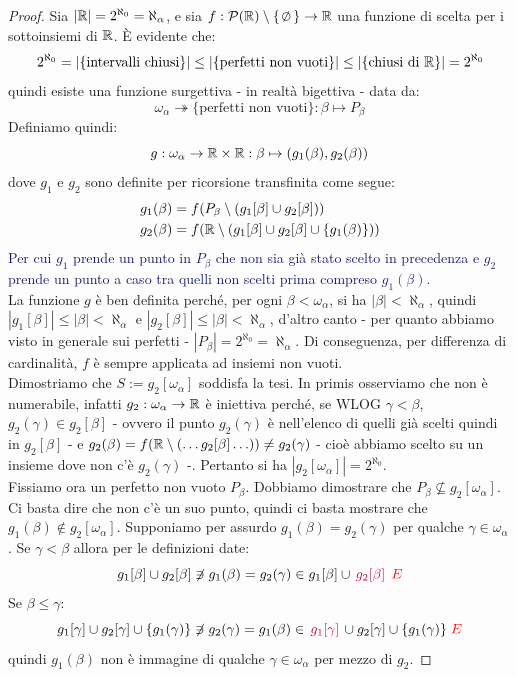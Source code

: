 \begin{proof}
	Sia $|\mathbb R| = 2^{\aleph_0} = \aleph_\alpha$, e sia $f : \ps(\RR) \setminus\{\emptyset\} \to \RR$ una funzione di scelta per i sottoinsiemi di $\mathbb R$. \`E evidente che:
	\[ 2^{\aleph_0} = |\{\text{intervalli chiusi}\}| \leq |\{\text{perfetti non vuoti}\}| \leq |\{\text{chiusi di $\mathbb R$}\}| = 2^{\aleph_0}
		\]
	quindi esiste una funzione surgettiva - in realt\`a bigettiva - data da:
	\[ \omega_\alpha \twoheadrightarrow \{\text{perfetti non vuoti}\} : \beta \mapsto P_\beta
		\]
	Definiamo quindi:
	\[ g : \omega_\alpha \to \mathbb R \times \mathbb R : \beta \mapsto (g_1(\beta),g_2(\beta))
		\]
	dove $g_1$ e $g_2$ sono definite per ricorsione transfinita come segue:
	\begin{align*}
		&g_1(\beta) = f(P_\beta \setminus(g_1[\beta] \cup g_2[\beta])) \\
		&g_2(\beta) = f(\mathbb R \setminus (g_1[\beta] \cup g_2[\beta] \cup \{g_1(\beta)\}))
	\end{align*}
	\textcolor{MidnightBlue}{Per cui $g_1$ prende un punto in $P_\beta$ che non sia gi\`a stato scelto in precedenza e $g_2$ prende un punto a caso tra quelli non scelti prima compreso $g_1(\beta)$.}\\
	La funzione $g$ \`e ben definita perch\'e, per ogni $\beta < \omega_\alpha$, si ha $|\beta| < \aleph_\alpha$, quindi $|g_1[\beta]| \leq |\beta| < \aleph_\alpha$ e $|g_2[\beta]|\leq |\beta| < \aleph_\alpha$,
	d'altro canto - per quanto abbiamo visto in generale sui perfetti - $|P_\beta| = 2^{\aleph_0} = \aleph_\alpha$. Di conseguenza, per differenza di cardinalit\`a, $f$ \`e sempre applicata ad insiemi non vuoti.\\
	Dimostriamo che $S := g_2[\omega_\alpha]$ soddisfa la tesi. In primis osserviamo che non \`e numerabile, infatti $g_2 : \omega_\alpha \to \mathbb R$ \`e iniettiva perch\'e, se WLOG $\gamma < \beta$, $g_2(\gamma) \in g_2[\beta]$ - ovvero il punto $g_2(\gamma)$ \`e nell'elenco di quelli gi\`a scelti quindi in $g_2[\beta]$ -
	e $g_2(\beta) = f(\mathbb R \setminus (\ldots g_2[\beta] \ldots)) \ne g_2(\gamma)$ - cio\`e abbiamo scelto su un insieme dove non c'\`e $g_2(\gamma)$ -.
	Pertanto si ha $|g_2[\omega_\alpha]| = 2^{\aleph_0}$.\\
	Fissiamo ora un perfetto non vuoto $P_\beta$. Dobbiamo dimostrare che $P_\beta \not\subseteq g_2[\omega_\alpha]$. Ci basta dire che non c'\`e un suo punto, quindi ci basta mostrare che $g_1(\beta) \not \in g_2[\omega_\alpha]$.
	Supponiamo per assurdo $g_1(\beta) = g_2(\gamma)$ per qualche $\gamma \in \omega_\alpha$. Se $\gamma < \beta$ allora per le definizioni date:
	\[  g_1[\beta] \cup g_2[\beta] \not\ni g_1(\beta) = g_2(\gamma) \in g_1[\beta] \cup \,\textcolor{purple}{g_2[\beta]}\, \;\textcolor{red}{\lightning}
		\]
	Se $\beta \leq \gamma$:
	\[ g_1[\gamma] \cup g_2[\gamma] \cup \{g_1(\gamma)\} \not\ni g_2(\gamma) = g_1(\beta) \in \,\textcolor{purple}{g_1[\gamma]}\, \cup g_2[\gamma] \cup \{g_1(\gamma)\} \;\textcolor{red}{\lightning}
		\]
	quindi $g_1(\beta)$ non \`e immagine di qualche $\gamma \in \omega_\alpha$ per mezzo di $g_2$.
\end{proof}


